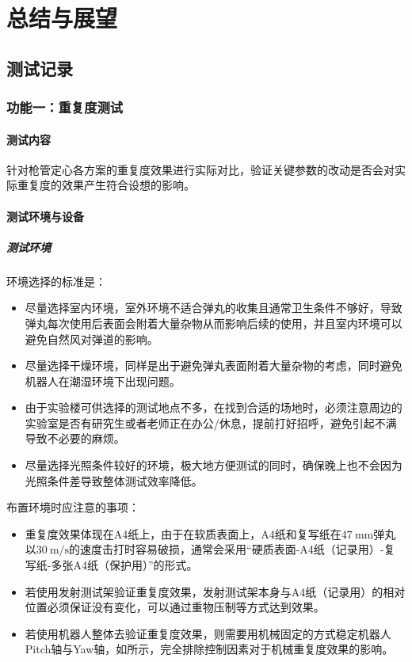 \chapter{总结与展望}

\section{测试记录}
\subsection{功能一：重复度测试}
\subsubsection{测试内容}
针对枪管定心各方案的重复度效果进行实际对比，验证关键参数的改动是否会对实际重复度的效果产生符合设想的影响。

\subsubsection{测试环境与设备}
\paragraph{测试环境}
环境选择的标准是：
\begin{itemize}
    \item 尽量选择室内环境，室外环境不适合弹丸的收集且通常卫生条件不够好，导致弹丸每次使用后表面会附着大量杂物从而影响后续的使用，并且室内环境可以避免自然风对弹道的影响。
    \item 尽量选择干燥环境，同样是出于避免弹丸表面附着大量杂物的考虑，同时避免机器人在潮湿环境下出现问题。
    \item 由于实验楼可供选择的测试地点不多，在找到合适的场地时，必须注意周边的实验室是否有研究生或者老师正在办公/休息，提前打好招呼，避免引起不满导致不必要的麻烦。
    \item 尽量选择光照条件较好的环境，极大地方便测试的同时，确保晚上也不会因为光照条件差导致整体测试效率降低。
\end{itemize}
布置环境时应注意的事项：
\begin{itemize}
    \item 重复度效果体现在A4纸上，由于在软质表面上，A4纸和复写纸在$\qty{47}{\mm}$弹丸以$\qty{30}{\metre\per\second}$的速度击打时容易破损，通常会采用“硬质表面-A4纸（记录用）-复写纸-多张A4纸（保护用）”的形式。
    \item 若使用发射测试架验证重复度效果，发射测试架本身与A4纸（记录用）的相对位置必须保证没有变化，可以通过重物压制等方式达到效果。
    \item 若使用机器人整体去验证重复度效果，则需要用机械固定的方式稳定机器人Pitch轴与Yaw轴，如所示，完全排除控制因素对于机械重复度效果的影响。    
\end{itemize}


